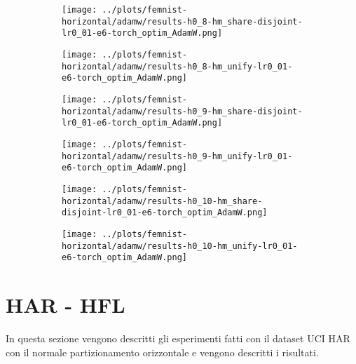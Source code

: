 \begin{figure}[htbp]  %
    \centering
    \begin{subfigure}[b]{0.47\textwidth}
        \centering
        \texttt{[image: ../plots/femnist-horizontal/adamw/results-h0\_8-hm\_share-disjoint-lr0\_01-e6-torch\_optim\_AdamW.png]}
    \end{subfigure}
    \hfill
    \begin{subfigure}[b]{0.47\textwidth}
        \centering
        \texttt{[image: ../plots/femnist-horizontal/adamw/results-h0\_8-hm\_unify-lr0\_01-e6-torch\_optim\_AdamW.png]}
    \end{subfigure}
\end{figure}
\begin{figure}[htbp]  %
    \centering
    \begin{subfigure}[b]{0.47\textwidth}
        \centering
        \texttt{[image: ../plots/femnist-horizontal/adamw/results-h0\_9-hm\_share-disjoint-lr0\_01-e6-torch\_optim\_AdamW.png]}
    \end{subfigure}
    \hfill
    \begin{subfigure}[b]{0.47\textwidth}
        \centering
        \texttt{[image: ../plots/femnist-horizontal/adamw/results-h0\_9-hm\_unify-lr0\_01-e6-torch\_optim\_AdamW.png]}
    \end{subfigure}
\end{figure}
\begin{figure}[htbp]  %
    \centering
    \begin{subfigure}[b]{0.47\textwidth}
        \centering
        \texttt{[image: ../plots/femnist-horizontal/adamw/results-h0\_10-hm\_share-disjoint-lr0\_01-e6-torch\_optim\_AdamW.png]}
    \end{subfigure}
    \hfill
    \begin{subfigure}[b]{0.47\textwidth}
        \centering
        \texttt{[image: ../plots/femnist-horizontal/adamw/results-h0\_10-hm\_unify-lr0\_01-e6-torch\_optim\_AdamW.png]}
    \end{subfigure}
\end{figure}
    

\clearpage
\section{HAR - HFL}
In questa sezione vengono descritti gli esperimenti fatti con il dataset
UCI HAR con il normale partizionamento orizzontale e vengono descritti 
i risultati.

